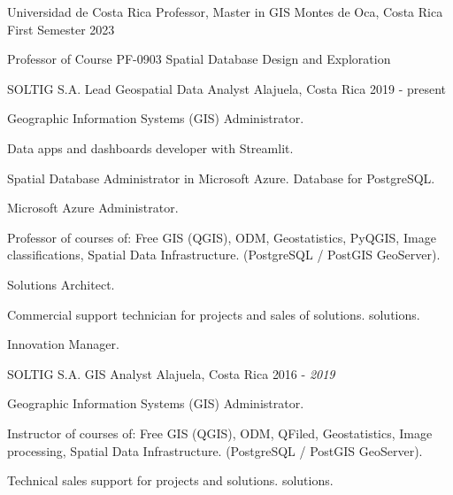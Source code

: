 

\begin{cventries}

  \cventry
    {Universidad de Costa Rica} %
    {Professor, Master in GIS} %
    {Montes de Oca, Costa Rica} %
    {First Semester 2023} %
    {
      \begin{cvitems} %
        \item Professor of Course PF-0903 Spatial Database Design and Exploration
      \end{cvitems}
    }
  \cventry
    {SOLTIG S.A.} %
    {Lead Geospatial Data Analyst} %
    {Alajuela, Costa Rica} %
    {2019 - present} %
    {
      \begin{cvitems} %
        \item Geographic Information Systems (GIS) Administrator.
        \item Data apps and dashboards developer with Streamlit.
        \item Spatial Database Administrator in Microsoft Azure.
        Database for PostgreSQL.
        \item Microsoft Azure Administrator.
        \item Professor of courses of: Free GIS (QGIS), ODM, Geostatistics, PyQGIS,
        Image classifications, Spatial Data Infrastructure.
        (PostgreSQL / PostGIS GeoServer).
        \item Solutions Architect.
        \item Commercial support technician for projects and sales of solutions.
        solutions.
        \item Innovation Manager.
      \end{cvitems}
    }
  \cventry
    {SOLTIG S.A.} %
    {GIS Analyst} %
    {Alajuela, Costa Rica} %
    {2016 - \textit{2019}} %
    {
      \begin{cvitems} %
        \item Geographic Information Systems (GIS) Administrator.
        \item Instructor of courses of: Free GIS (QGIS), ODM, QFiled, Geostatistics,
        Image processing, Spatial Data Infrastructure.
        (PostgreSQL / PostGIS GeoServer).
        \item Technical sales support for projects and solutions.
        solutions.
      \end{cvitems}
    }
\end{cventries}